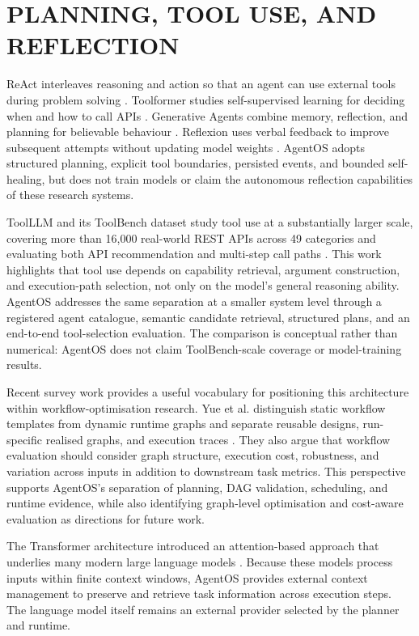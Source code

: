\section{\uppercase{Planning, Tool Use, and Reflection}}
ReAct interleaves reasoning and action so that an agent can use external tools during problem solving \cite{yao2023react}. Toolformer studies self-supervised learning for deciding when and how to call APIs \cite{schick2023toolformer}. Generative Agents combine memory, reflection, and planning for believable behaviour \cite{park2023generative}. Reflexion uses verbal feedback to improve subsequent attempts without updating model weights \cite{shinn2023reflexion}. AgentOS adopts structured planning, explicit tool boundaries, persisted events, and bounded self-healing, but does not train models or claim the autonomous reflection capabilities of these research systems.

ToolLLM and its ToolBench dataset study tool use at a substantially larger scale, covering more than 16,000 real-world REST APIs across 49 categories and evaluating both API recommendation and multi-step call paths \cite{qin2023toolllm}. This work highlights that tool use depends on capability retrieval, argument construction, and execution-path selection, not only on the model's general reasoning ability. AgentOS addresses the same separation at a smaller system level through a registered agent catalogue, semantic candidate retrieval, structured plans, and an end-to-end tool-selection evaluation. The comparison is conceptual rather than numerical: AgentOS does not claim ToolBench-scale coverage or model-training results.

Recent survey work provides a useful vocabulary for positioning this architecture within workflow-optimisation research. Yue et al. distinguish static workflow templates from dynamic runtime graphs and separate reusable designs, run-specific realised graphs, and execution traces \cite{yue2026workflow}. They also argue that workflow evaluation should consider graph structure, execution cost, robustness, and variation across inputs in addition to downstream task metrics. This perspective supports AgentOS's separation of planning, DAG validation, scheduling, and runtime evidence, while also identifying graph-level optimisation and cost-aware evaluation as directions for future work.

The Transformer architecture introduced an attention-based approach that underlies many modern large language models \cite{vaswani2017attention}. Because these models process inputs within finite context windows, AgentOS provides external context management to preserve and retrieve task information across execution steps. The language model itself remains an external provider selected by the planner and runtime.

